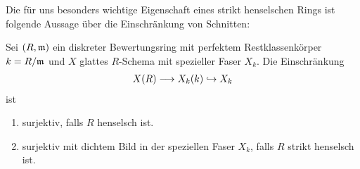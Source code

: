 Die für uns besonders wichtige Eigenschaft eines strikt henselschen
Rings ist folgende Aussage über die Einschränkung von Schnitten:
\begin{Satz}
  \label{thm:eigstrikthenselsch}
  Sei $(R,\mathfrak{m})$ ein diskreter Bewertungsring mit perfektem
  Restklassenkörper $k=R/\mathfrak{m}$ und $X$ glattes $R$-Schema mit spezieller
  Faser $X_k$.
  Die Einschränkung
  \begin{gather*}
    X(R)\longrightarrow X_k(k)\hookrightarrow X_k
  \end{gather*}
  ist
  \begin{enumerate}[label=(\roman*)]
  \item surjektiv, falls $R$ henselsch ist.
  \item surjektiv mit dichtem Bild in der speziellen Faser $X_k$,
    falls $R$ strikt henselsch ist.
  \end{enumerate}
\end{Satz}

